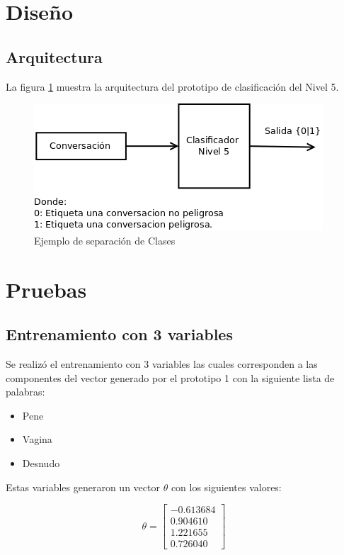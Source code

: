 \section{Dise\~no}
\subsection{Arquitectura}
La figura \ref{fig:arquitecturaClasificador} muestra la arquitectura del prototipo de clasificaci\'on del Nivel 5.
\begin{figure}[h]
	\begin{center}
	\includegraphics[scale=.5]{images/arquitecturaClasificador}
	\caption{Ejemplo de separaci\'on de Clases}
	\label{fig:arquitecturaClasificador}
	\end{center}
\end{figure}

\section{Pruebas}

\subsection{Entrenamiento con 3 variables}
Se realiz\'o el entrenamiento con 3 variables las cuales corresponden a las componentes del vector generado por el prototipo 1 con la siguiente lista de palabras:
\begin{itemize}
\item Pene
\item Vagina
\item Desnudo
\end{itemize}

Estas variables generaron un vector $\theta$ con los siguientes valores:

\begin{equation}
\theta = 
\begin{bmatrix}

-0.613684 \\
 0.904610 \\
 1.221655 \\
 0.726040
\end{bmatrix}
\end{equation}

